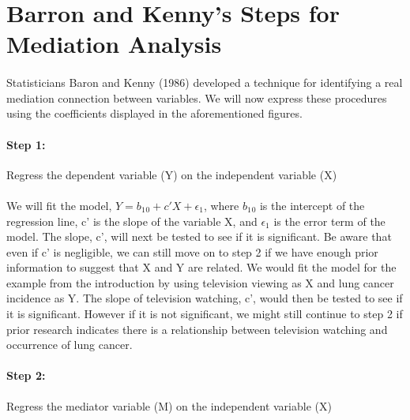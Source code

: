 \documentclass[12pt]{report}
\begin{document}
\section*{Barron and Kenny's Steps for Mediation Analysis}

\paragraph{}
Statisticians Baron and Kenny (1986) developed a technique for identifying a real mediation connection between variables. We will now express these procedures using the coefficients displayed in the aforementioned figures. \cite{hayes2009beyond}

\paragraph{Step 1:}
Regress the dependent variable (Y) on the independent variable (X)

\paragraph{}

We will fit the model, \begin{math}Y=b_1{}_0 +c' X+\epsilon_1\end{math}, where \begin{math}b_1{}_0\end{math} is the intercept of the regression line, c’ is the slope of the variable X, and \begin{math}\epsilon_1\end{math} is the error term of the model. The slope, c', will next be tested to see if it is significant. Be aware that even if c' is negligible, we can still move on to step 2 if we have enough prior information to suggest that X and Y are related. We would fit the model for the example from the introduction by using television viewing as X and lung cancer incidence as Y. The slope of television watching, c', would then be tested to see if it is significant. However if it is not significant, we might still continue to step 2 if prior research indicates there is a relationship between television watching and occurrence of lung cancer.

\paragraph{Step 2:}
Regress the mediator variable (M) on the independent variable (X)
\end{document}
